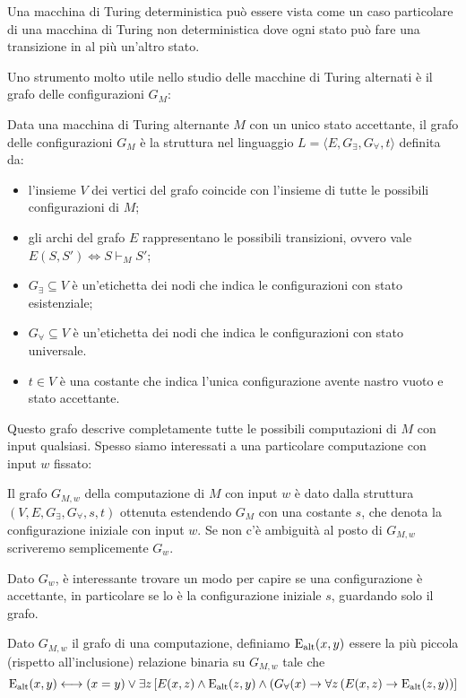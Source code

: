 \begin{osservazione}
 Una macchina di Turing deterministica può essere vista come un caso particolare
 di una macchina di Turing non deterministica dove ogni
 stato può fare una transizione in al più un'altro stato.
\end{osservazione}

Uno strumento molto utile nello studio delle macchine di Turing alternati è
il grafo delle configurazioni $G_M$:

\begin{definizione}
 Data una macchina di  Turing alternante $M$ con un unico stato accettante,
 il grafo delle configurazioni $G_M$
 è la struttura nel linguaggio $L=\langle E, G_\exists, G_\forall, t\rangle$
 definita da:
 \begin{itemize}
  \item l'insieme $V$ dei vertici del grafo coincide con l'insieme di tutte le
  possibili configurazioni di $M$;
  \item gli archi del grafo $E$ rappresentano le possibili transizioni, ovvero
  vale $E(S,S') \iff S \vdash_M S'$;
  \item $G_\exists \subseteq V$ è un'etichetta dei nodi che indica le configurazioni
  con stato esistenziale;
  \item $G_\forall \subseteq V$ è un'etichetta dei nodi che indica le configurazioni
  con stato universale.
  \item $t \in V$ è una costante che indica l'unica configurazione avente nastro
  vuoto e stato accettante.
 \end{itemize}
\end{definizione}
Questo grafo descrive completamente tutte le possibili computazioni di $M$ con
input qualsiasi. Spesso siamo interessati a una particolare computazione
con input $w$ fissato:
\begin{definizione}
 Il grafo $G_{M,w}$
 della computazione di $M$ con input $w$ è dato dalla
 struttura $(V,E, G_\exists, G_\forall, s, t)$ ottenuta estendendo $G_M$
 con una costante $s$, che denota la configurazione iniziale con input $w$.
 Se non c'è ambiguità al posto di $G_{M,w}$ scriveremo semplicemente $G_w$.
\end{definizione}
Dato $G_w$, è interessante trovare un modo per capire se una configurazione
è accettante, in particolare se lo è la configurazione iniziale $s$, guardando
solo il grafo.
\begin{definizione}
\label{def:Ealt}
 Dato $G_{M,w}$ il grafo di una computazione,
 definiamo $\operatorname{E_{alt}}(x,y)$ essere la
 più piccola (rispetto all'inclusione) relazione binaria su $G_{M,w}$ tale che
 \[
  \operatorname{E_{alt}}(x,y) \longleftrightarrow (x=y) \lor \exists z 
  \left[ E(x,z) \land \operatorname{E_{alt}}(z,y) \land (G_\forall(x) \rightarrow \forall z\left(E(x,z) \rightarrow \operatorname{E_{alt}}(z,y)\right)\right]
 \]
\end{definizione}
